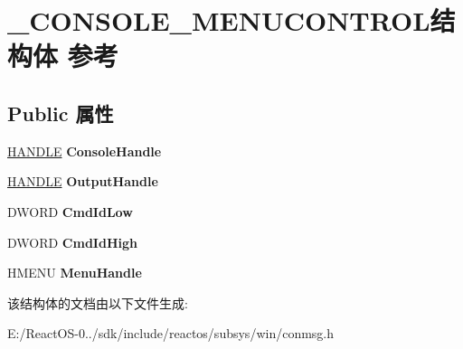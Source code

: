 \hypertarget{struct___c_o_n_s_o_l_e___m_e_n_u_c_o_n_t_r_o_l}{}\section{\+\_\+\+C\+O\+N\+S\+O\+L\+E\+\_\+\+M\+E\+N\+U\+C\+O\+N\+T\+R\+O\+L结构体 参考}
\label{struct___c_o_n_s_o_l_e___m_e_n_u_c_o_n_t_r_o_l}
\subsection*{Public 属性}
\begin{DoxyCompactItemize}
\item 
\mbox{\label{struct___c_o_n_s_o_l_e___m_e_n_u_c_o_n_t_r_o_l_a0df9174e0085d46986b9a52dc85c7d97}} 
\hyperlink{interfacevoid}{H\+A\+N\+D\+LE} {\bfseries Console\+Handle}
\item 
\mbox{\label{struct___c_o_n_s_o_l_e___m_e_n_u_c_o_n_t_r_o_l_a17779e13d74bfc3cd6b15d0480b26b62}} 
\hyperlink{interfacevoid}{H\+A\+N\+D\+LE} {\bfseries Output\+Handle}
\item 
\mbox{\label{struct___c_o_n_s_o_l_e___m_e_n_u_c_o_n_t_r_o_l_a12a12d2f5e75d5e3c9d6999dd1bb2e96}} 
D\+W\+O\+RD {\bfseries Cmd\+Id\+Low}
\item 
\mbox{\label{struct___c_o_n_s_o_l_e___m_e_n_u_c_o_n_t_r_o_l_a0fa94d9bd011fae53412b55d0f1e001b}} 
D\+W\+O\+RD {\bfseries Cmd\+Id\+High}
\item 
\mbox{\label{struct___c_o_n_s_o_l_e___m_e_n_u_c_o_n_t_r_o_l_a32637259ff94d450aee51e3fc3ca41cd}} 
H\+M\+E\+NU {\bfseries Menu\+Handle}
\end{DoxyCompactItemize}


该结构体的文档由以下文件生成\+:\begin{DoxyCompactItemize}
\item 
E\+:/\+React\+O\+S-\/0../sdk/include/reactos/subsys/win/conmsg.\+h\end{DoxyCompactItemize}

